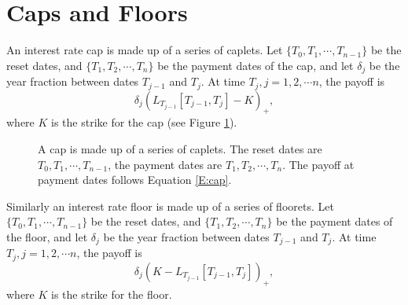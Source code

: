 \section{Caps and Floors}
An interest rate cap is made up of a series of caplets. 
Let $\{T_0,T_1,\cdots,T_{n-1}\}$ be the reset dates, and
$\{T_1,T_2,\cdots,T_{n}\}$ be the payment dates of the cap, 
and let $\delta_{j}$ be the year fraction between dates $T_{j-1}$ and $T_j$.
At time $T_j,j=1,2,\cdots n$, the payoff is
\begin{equation} \label{E:cap}
  \delta_j \left( L_{T_{j-1}}[T_{j-1},T_j] - K \right)_+,
\end{equation}
where $K$ is the strike for the cap (see Figure \ref{F:cap}).

\begin{figure}
  \caption{A cap is made up of a series of caplets.
    The reset dates are $T_0,T_1,\cdots,T_{n-1}$, the payment dates are
    $T_1,T_2,\cdots,T_{n}$. The payoff at payment dates follows 
    Equation \ref{E:cap}.}
  \label{F:cap}
\end{figure}

Similarly an interest rate floor is made up of a series of floorets. 
Let $\{T_0,T_1,\cdots,T_{n-1}\}$ be the reset dates, and
$\{T_1,T_2,\cdots,T_{n}\}$ be the payment dates of the floor, 
and let $\delta_{j}$ be the year fraction between dates $T_{j-1}$ and $T_j$.
At time $T_j,j=1,2,\cdots n$, the payoff is
\begin{equation} \label{E:cap}
  \delta_j \left( K - L_{T_{j-1}}[T_{j-1},T_j] \right)_+,
\end{equation}
where $K$ is the strike for the floor.


